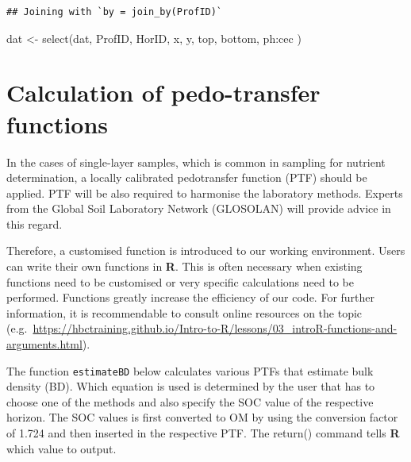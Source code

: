 \documentclass[
  10pt,
  b5paper,
  oneside]{book}
\newenvironment{Shaded}{\begin{snugshade}}{\end{snugshade}}
\newcommand{\FunctionTok}[1]{\textcolor[rgb]{0.00,0.00,0.00}{#1}}
\newcommand{\NormalTok}[1]{#1}
\newcommand{\OtherTok}[1]{\textcolor[rgb]{0.56,0.35,0.01}{#1}}
\newcommand{\SpecialCharTok}[1]{\textcolor[rgb]{0.00,0.00,0.00}{#1}}
\begin{document}
\begin{verbatim}
## Joining with `by = join_by(ProfID)`
\end{verbatim}

\begin{Shaded}
\begin{Highlighting}[]
\NormalTok{dat }\OtherTok{\textless{}{-}} \FunctionTok{select}\NormalTok{(dat, ProfID, HorID, x, y, top, bottom, ph}\SpecialCharTok{:}\NormalTok{cec )}
\end{Highlighting}
\end{Shaded}

\hypertarget{calculation-of-pedo-transfer-functions}{%
\section{Calculation of pedo-transfer functions}\label{calculation-of-pedo-transfer-functions}}

In the cases of single-layer samples, which is common in sampling for nutrient determination, a locally calibrated pedotransfer function (PTF) should be applied. PTF will be also required to harmonise the laboratory methods. Experts from the Global Soil Laboratory Network (GLOSOLAN) will provide advice in this regard.

Therefore, a customised function is introduced to our working environment. Users can write their own functions in \textbf{R}. This is often necessary when existing functions need to be customised or very specific calculations need to be performed. Functions greatly increase the efficiency of our code. For further information, it is recommendable to consult online resources on the topic (e.g.~\url{https://hbctraining.github.io/Intro-to-R/lessons/03_introR-functions-and-arguments.html}).

The function \texttt{estimateBD} below calculates various PTFs that estimate bulk density (BD). Which equation is used is determined by the user that has to choose one of the methods and also specify the SOC value of the respective horizon. The SOC values is first converted to OM by using the conversion factor of 1.724 and then inserted in the respective PTF. The return() command tells \textbf{R} which value to output.
\end{document}
